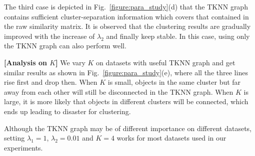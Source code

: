 {\noindent{\small$\bullet$}
The third case is depicted in Fig.~\ref{figure:para_study}(d) that
the TKNN graph contains sufficient cluster-separation information which covers that contained in the raw similarity matrix.
It is observed that 
the clustering results are gradually improved with the increase of $\lambda_2$ and finally keep stable.
In this case,
using only the TKNN graph can also perform well.

\textbf{[Analysis on $K$]}
We vary $K$ on datasets with useful TKNN graph
and get similar results as shown in Fig.~\ref{figure:para_study}(e),
where all the three lines rise first and drop then.
When $K$ is small,
objects in the same cluster but far away from each other will still be disconnected in the TKNN graph.
When $K$ is large,
it is more likely that objects in different clusters will be connected,
which ends up leading to disaster for clustering.

Although the TKNN graph may be of different importance on different datasets,
setting $\lambda_1 = 1$, $\lambda_2 = 0.01$ and $K = 4$ works for most datasets used in our experiments.
}
